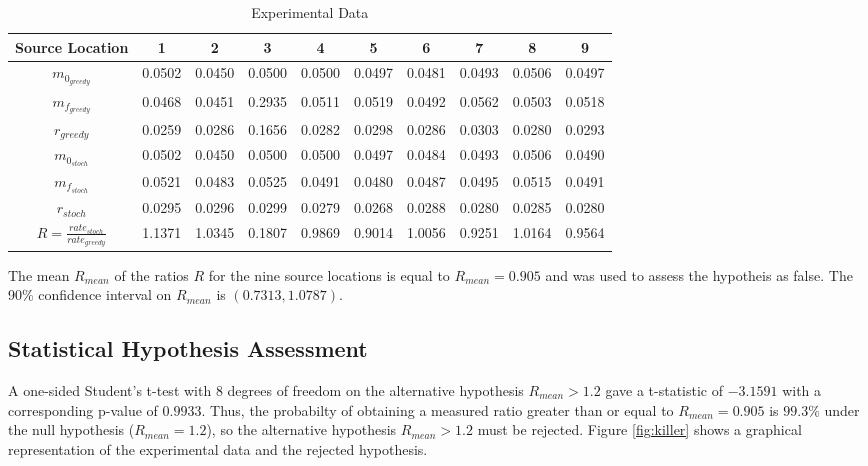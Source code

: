 \documentclass[submit]{aiaa-pretty-modified}
\begin{document}
\begin{table}[htb]
\begin{center}
\begin{tabular}{|c||c||c||c||c||c||c||c||c||c|}
\hline
 Source Location & 1 & 2 & 3 & 4 & 5 & 6 & 7 & 8 & 9 \\
\hline \hline
$m_{0_{greedy}}$ & 0.0502 & 0.0450 & 0.0500 & 0.0500 & 0.0497 & 0.0481 & 0.0493 & 0.0506 & 0.0497 \\
\hline
$m_{f_{greedy}}$ & 0.0468 & 0.0451 & 0.2935 & 0.0511 & 0.0519 & 0.0492 & 0.0562 & 0.0503 & 0.0518 \\
\hline
$r_{greedy}$ & 0.0259 & 0.0286 & 0.1656 & 0.0282 & 0.0298 & 0.0286 & 0.0303 & 0.0280 & 0.0293 \\
\hline
$m_{0_{stoch}}$ & 0.0502 & 0.0450 & 0.0500 & 0.0500 & 0.0497 & 0.0484 & 0.0493 & 0.0506 & 0.0490 \\
\hline
$m_{f_{stoch}}$ & 0.0521 & 0.0483 & 0.0525 & 0.0491 & 0.0480 & 0.0487 & 0.0495 & 0.0515 & 0.0491 \\
\hline
$r_{stoch}$ & 0.0295 & 0.0296 & 0.0299 & 0.0279 & 0.0268 & 0.0288 & 0.0280 & 0.0285 & 0.0280 \\
\hline
\hline
$R = \frac{rate_{stoch}}{rate_{greedy}}$  & 1.1371 & 1.0345 & 0.1807 & 0.9869 & 0.9014 & 1.0056 & 0.9251 & 1.0164 & 0.9564\\
\hline
\end{tabular}
\caption{Experimental Data \label{tab:data} }
\end{center}
\end{table}

The mean $R_{mean}$ of the ratios $R$ for the nine source locations is equal to
$R_{mean} = 0.905$ and was used to assess the hypotheis as false. The
90\% confidence interval on $R_{mean}$ is $(0.7313,1.0787)$.

\subsection{Statistical Hypothesis Assessment}
A one-sided Student's t-test with 8 degrees of freedom on the
alternative hypothesis $R_{mean} > 1.2$ gave a t-statistic of $-3.1591$ with a
corresponding p-value of $0.9933$.  Thus, the probabilty of
obtaining a measured ratio greater than or equal to $R_{mean} = 0.905$
is $99.3\%$ under the null hypothesis ($R_{mean} = 1.2$), so the
alternative hypothesis $R_{mean} > 1.2$ must be rejected.  Figure
\ref{fig:killer} shows a graphical representation of the experimental
data and the rejected hypothesis.
\end{document}
